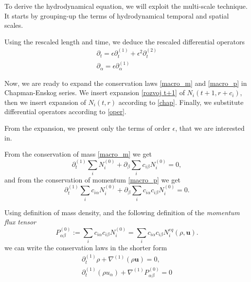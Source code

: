 To derive the hydrodynamical equation, we will exploit the multi-scale technique. It starts by grouping-up the terms of hydrodynamical temporal and spatial scales.


\bigskip
Using the rescaled length and time, we deduce the rescaled differential operators
\begin{equation} \label{oper}
\begin{split}
\partial_t = \epsilon \partial_t^{(1)} + \epsilon^2 \partial_t^{(2)} \\
\partial_{\alpha} = \epsilon \partial_{\alpha}^{(1)}
\end{split}
\end{equation}

Now, we are ready to expand the conservation laws \ref{macro_m} and \ref{macro_p} in Chapman-Enskog series. We insert expansion \ref{rozvoj t+1} of $N_i(t+1,r+c_i)$, then we insert expansion of $N_i(t,r)$ according to \ref{chap}. Finally, we substitute differential operators according to \ref{oper}.

From the expansion, we present only the terms of order $\epsilon$, that we are interested in.

From the conservation of mass \ref{macro_m} we get
\begin{equation}
\partial_t^{(1)} \sum_i N_i^{(0)} + \partial_{\beta} \sum_i c_{i\beta} N_i^{(0)} = 0,
\end{equation}
and from the conservation of momentum \ref{macro_p} we get
\begin{equation}
\partial_t^{(1)} \sum_i c_{i\alpha} N_i^{(0)} + \partial_{\beta} \sum_i c_{i\alpha} c_{i\beta} N_i^{(0)} = 0.
\end{equation}

Using definition of mass density, and the following definition of the \textit{momentum flux tensor}
\begin{equation}
P^{(0)}_{\alpha\beta} := \sum_i c_{i\alpha} c_{i\beta} N_i^{(0)} = \sum_i c_{i\alpha} c_{i\beta} N_i^{eq}(\rho, \bm{u}).
\end{equation}
we can write the conservation laws in the shorter form
\begin{equation} 
\begin{split}
\partial_t^{(1)} \rho + \nabla^{(1)}(\rho \bm{u}) = 0, \\ 
\partial_t^{(1)} (\rho u_{\alpha}) + \nabla^{(1)} P^{(0)}_{\alpha\beta} = 0 \label{eul_primitive}
\end{split}
\end{equation}

